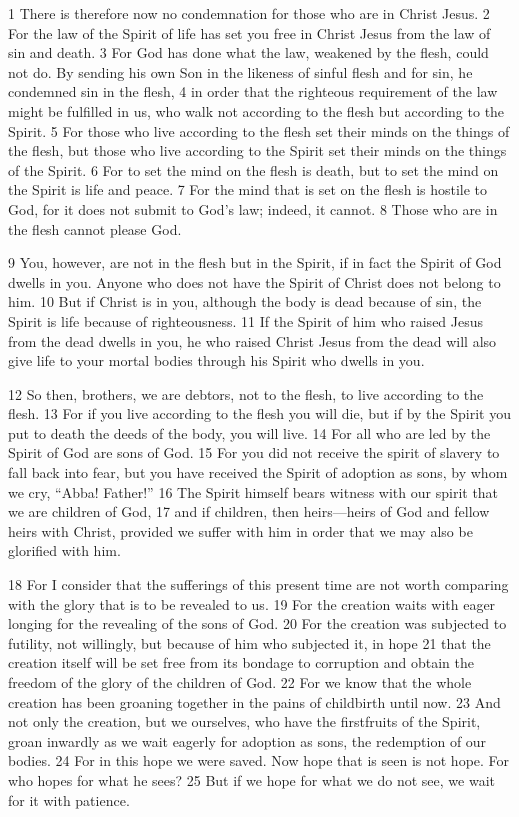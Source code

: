 \begin{bible}

1 There is therefore now no condemnation for those who are in Christ Jesus. 2 For the law of the Spirit of life has set you free in Christ Jesus from the law of sin and death. 3 For God has done what the law, weakened by the flesh, could not do. By sending his own Son in the likeness of sinful flesh and for sin, he condemned sin in the flesh, 4 in order that the righteous requirement of the law might be fulfilled in us, who walk not according to the flesh but according to the Spirit. 5 For those who live according to the flesh set their minds on the things of the flesh, but those who live according to the Spirit set their minds on the things of the Spirit. 6 For to set the mind on the flesh is death, but to set the mind on the Spirit is life and peace. 7 For the mind that is set on the flesh is hostile to God, for it does not submit to God's law; indeed, it cannot. 8 Those who are in the flesh cannot please God.

9 You, however, are not in the flesh but in the Spirit, if in fact the Spirit of God dwells in you. Anyone who does not have the Spirit of Christ does not belong to him. 10 But if Christ is in you, although the body is dead because of sin, the Spirit is life because of righteousness. 11 If the Spirit of him who raised Jesus from the dead dwells in you, he who raised Christ Jesus from the dead will also give life to your mortal bodies through his Spirit who dwells in you.

12 So then, brothers, we are debtors, not to the flesh, to live according to the flesh. 13 For if you live according to the flesh you will die, but if by the Spirit you put to death the deeds of the body, you will live. 14 For all who are led by the Spirit of God are sons of God. 15 For you did not receive the spirit of slavery to fall back into fear, but you have received the Spirit of adoption as sons, by whom we cry, ``Abba! Father!'' 16 The Spirit himself bears witness with our spirit that we are children of God, 17 and if children, then heirs—heirs of God and fellow heirs with Christ, provided we suffer with him in order that we may also be glorified with him.

18 For I consider that the sufferings of this present time are not worth comparing with the glory that is to be revealed to us. 19 For the creation waits with eager longing for the revealing of the sons of God. 20 For the creation was subjected to futility, not willingly, but because of him who subjected it, in hope 21 that the creation itself will be set free from its bondage to corruption and obtain the freedom of the glory of the children of God. 22 For we know that the whole creation has been groaning together in the pains of childbirth until now. 23 And not only the creation, but we ourselves, who have the firstfruits of the Spirit, groan inwardly as we wait eagerly for adoption as sons, the redemption of our bodies. 24 For in this hope we were saved. Now hope that is seen is not hope. For who hopes for what he sees? 25 But if we hope for what we do not see, we wait for it with patience.


\end{bible}
